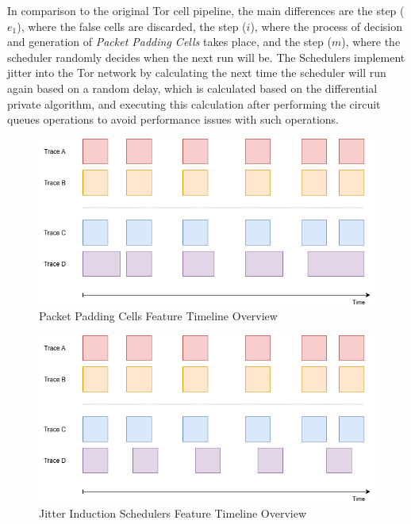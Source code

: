 In comparison to the original Tor cell pipeline, the main differences are the step (\(e_1\)), where the false cells are discarded, the step (\(i\)), where the process of decision and generation of \textit{Packet Padding Cells} takes place, and the step (\(m\)), where the scheduler randomly decides when the next run will be. The Schedulers implement jitter into the Tor network by calculating the next time the scheduler will run again based on a random delay, which is calculated based on the differential private algorithm, and executing this calculation after performing the circuit queues operations to avoid performance issues with such operations.
\begin{figure}[!h]
  \centering
  \includegraphics[width=\textwidth]{Chapters/Figures/PPC_Timeline.png}
  \caption{Packet Padding Cells Feature Timeline Overview}\label{fig:ppc_timeline}
\end{figure}

\begin{figure}[!h]
  \centering
  \includegraphics[width=\textwidth]{Chapters/Figures/JIS_Timeline.png}
  \caption{Jitter Induction Schedulers Feature Timeline Overview}\label{fig:jis_timeline}
\end{figure}

